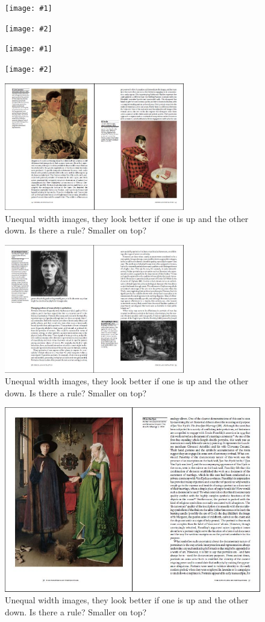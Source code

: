 \documentclass{book}
\def\doubletakeimage#1#2{%
  \renewcommand{\topfraction}{.95}  %
  \begin{figure}[t]
    \thispagestyle{caption}
    \texttt{[image: \#1]}%
  \end{figure}
  \begin{figure}[tp]
   \hspace*{-\marginparwidth}\texttt{[image: \#2]}
 \end{figure}
}
\renewcommand{\topfraction}{.95}
\begin{document}
\doubletakeimage{matron}{stuartpearson}
\lipsum[1-4]
\doubletakeimage{stuartpearson}{matron}
\lipsum[1-4]

\setcounter{topnumber}{3}
\setcounter{bottomnumber}{0}
\begin{figure}[tp]
  \includegraphics[width=0.7\textwidth]{2-unequal}
  \caption{Unequal width images, they look better if one is up and the other down. Is there a rule? Smaller on top?}
\end{figure}

\begin{figure}[b]
  \includegraphics[width=0.7\textwidth]{2-unequal-01}
  \caption{Unequal width images, they look better if one is up and the other down. Is there a rule? Smaller on top?}
\end{figure}

\begin{figure}[b]
  \includegraphics[width=\textwidth]{1-fullpage}
  \caption{Unequal width images, they look better if one is up and the other down. Is there a rule? Smaller on top?}
\end{figure}
\end{document}
